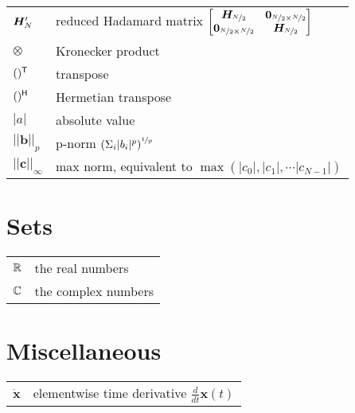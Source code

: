\begin{tabular}{ p{2cm} l }
    $\bm{H_}{N}'$   & reduced Hadamard matrix
    $
    \begin{bmatrix}
        \bm{H_}{\nicefrac{N}{2}} & \bm{0}_{\nicefrac{N}{2} \times \nicefrac{N}{2}} \\
        \bm{0}_{\nicefrac{N}{2} \times \nicefrac{N}{2}} & \bm{H_}{\nicefrac{N}{2}}
    \end{bmatrix}
    $ \\

    $\otimes$   & Kronecker product \\
    $()^\mathsf{T}$   & transpose \\
    $()^\mathsf{H}$  & Hermetian transpose \\
    $|a|$       & absolute value \\
    $||\bm{b}||_p$      & p-norm $\left( \Sigma_i |b_i|^p \right)^{\nicefrac{1}{p}}$ \\
    $||\bm{c}||_{\infty}$        & max norm, equivalent to $\max(|c_0|,|c_1|, \cdots |c_{N-1}|)$ \\

\end{tabular}


\section*{Sets}
\begin{tabular}{ p{2cm} l }
    $\mathbb{R}$    & the real numbers \\
    $\mathbb{C}$    & the complex numbers
\end{tabular}

\section*{Miscellaneous}
\begin{tabular}{ p{2cm} l }
    $\dot{\bm{x}}$    & elementwise time derivative $\frac{d}{dt}\bm{x}(t)$ \\

\end{tabular}

